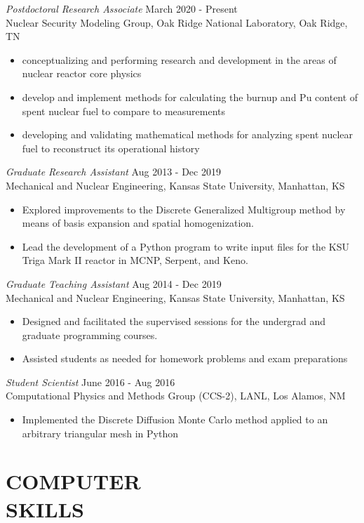 \documentclass[margin, 10pt]{res} %
\begin{document}
\begin{resume}
{\sl Postdoctoral Research Associate} \hfill March 2020 - Present \\
Nuclear Security Modeling Group, Oak Ridge National Laboratory, Oak Ridge, TN
\begin{itemize}
    \item conceptualizing and performing research and development in the areas of nuclear reactor core physics 
    \item develop and implement methods for calculating the burnup and Pu content of spent nuclear fuel to compare to measurements
    \item developing and validating mathematical methods for analyzing spent nuclear fuel to reconstruct its operational history
\end{itemize}

{\sl Graduate Research Assistant} \hfill Aug 2013 - Dec 2019 \\
Mechanical and Nuclear Engineering, Kansas State University, Manhattan, KS
\begin{itemize}
    \item Explored improvements to the Discrete Generalized Multigroup method by means of basis expansion and spatial homogenization.
    \item Lead the development of a Python program to write input files for the KSU Triga Mark II reactor in MCNP, Serpent, and Keno.
\end{itemize}

{\sl Graduate Teaching Assistant} \hfill Aug 2014 - Dec 2019 \\
Mechanical and Nuclear Engineering, Kansas State University, Manhattan, KS
\begin{itemize}
\item Designed and facilitated the supervised sessions for the undergrad and graduate programming courses.
\item Assisted students as needed for homework problems and exam preparations
\end{itemize}

{\sl Student Scientist} \hfill June 2016 - Aug 2016 \\
Computational Physics and Methods Group (CCS-2), LANL, Los Alamos, NM
\begin{itemize}
\item Implemented the Discrete Diffusion Monte Carlo method applied to an arbitrary triangular mesh in Python
\end{itemize}

\section{COMPUTER \\ SKILLS}


\end{resume}
\end{document}

